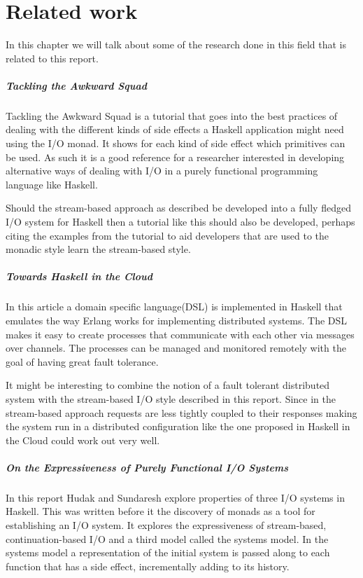\chapter{Related work}

In this chapter we will talk about some of the research done in this field that is related to this report.

\paragraph{Tackling the Awkward Squad\cite{Jones02tacklingthe}}
Tackling the Awkward Squad is a tutorial that goes into the best practices of dealing with the different kinds of side effects a Haskell application might need using the I/O monad. It shows for each kind of side effect which primitives can be used. As such it is a good reference for a researcher interested in developing alternative ways of dealing with I/O in a purely functional programming language like Haskell.

Should the stream-based approach as described be developed into a fully fledged I/O system for Haskell then a tutorial like this should also be developed, perhaps citing the examples from the tutorial to aid developers that are used to the monadic style learn the stream-based style.

\paragraph{Towards Haskell in the Cloud\cite{epstein_haskell_????}}
In this article a domain specific language(DSL) is implemented in Haskell that emulates the way Erlang works for implementing distributed systems. The DSL makes it easy to create processes that communicate with each other via messages over channels. The processes can be managed and monitored remotely with the goal of having great fault tolerance. 

It might be interesting to combine the notion of a fault tolerant distributed system with the stream-based I/O style described in this report. Since in the stream-based approach requests are less tightly coupled to their responses making the system run in a distributed configuration like the one proposed in Haskell in the Cloud could work out very well.

\paragraph{On the Expressiveness of Purely Functional I/O Systems\cite{Hudak89onthe}}
In this report Hudak and Sundaresh explore properties of three I/O systems in Haskell.
This was written before it the discovery of monads as a tool for establishing an I/O system.
It explores the expressiveness of stream-based, continuation-based I/O and a third model called the systems model. In the systems model a representation of the initial system is passed along to each function that has a side effect, incrementally adding to its history. 

